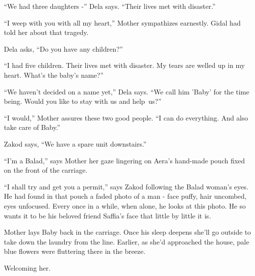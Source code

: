 \documentclass[twoside,11pt]{book}
\begin{document}
``We had three daughters -'' Dela says. ``Their lives met with
disaster.'' 

``I weep with you with all my heart,'' Mother sympathizes earnestly. Gidal had told her about
that tragedy. 

Dela asks, ``Do you have any children?'' 

``I had five children. Their lives met with disaster. My tears are welled up in my heart. What's the baby's
name?'' 

``We haven't decided on a name yet,'' Dela says. ``We call him 'Baby' for the
time being. Would you like to stay with us and help~us?'' 

``I would,'' Mother assures these two good people. ``I can do everything. And
also take care of Baby.'' 

Zakod says, ``We have a spare unit downstairs.'' 

``I'm a Balad,'' says Mother her gaze lingering on Aera's hand-made pouch fixed on the front
of the carriage. 

``I shall try and get you a permit,'' says Zakod following the Balad woman's eyes. He had
found in that pouch a faded photo of a man - face puffy, hair uncombed, eyes unfocused. Every once in a while, when
alone, he looks at this photo. He so wants it to be his beloved friend Saffia's face that little by little it is. 

Mother lays Baby back in the carriage. Once his sleep deepens she'll go outside to take down the laundry from the line.
Earlier, as she'd approached the house, pale blue flowers were fluttering there in the breeze. 

Welcoming her.
\end{document}
